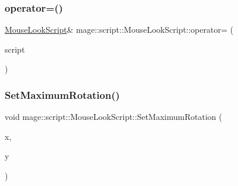 \subsubsection{\texorpdfstring{operator=()}{operator=()}\hspace{0.1cm}{\footnotesize\ttfamily [2/2]}}
{\footnotesize\ttfamily \hyperlink{classmage_1_1script_1_1_mouse_look_script}{Mouse\+Look\+Script}\& mage\+::script\+::\+Mouse\+Look\+Script\+::operator= (\begin{DoxyParamCaption}\item[{\hyperlink{classmage_1_1script_1_1_mouse_look_script}{Mouse\+Look\+Script} \&\&}]{script }\end{DoxyParamCaption})\hspace{0.3cm}{\ttfamily [delete]}}

\hypertarget{classmage_1_1script_1_1_mouse_look_script_a50c3ddaad18713509394d168cddc8aa8}{}\label{classmage_1_1script_1_1_mouse_look_script_a50c3ddaad18713509394d168cddc8aa8} 
\subsubsection{\texorpdfstring{Set\+Maximum\+Rotation()}{SetMaximumRotation()}\hspace{0.1cm}{\footnotesize\ttfamily [1/4]}}
{\footnotesize\ttfamily void mage\+::script\+::\+Mouse\+Look\+Script\+::\+Set\+Maximum\+Rotation (\begin{DoxyParamCaption}\item[{\hyperlink{namespacemage_aa97e833b45f06d60a0a9c4fc22ae02c0}{F32}}]{x,  }\item[{\hyperlink{namespacemage_aa97e833b45f06d60a0a9c4fc22ae02c0}{F32}}]{y }\end{DoxyParamCaption})\hspace{0.3cm}{\ttfamily [noexcept]}}

\hypertarget{classmage_1_1script_1_1_mouse_look_script_a50090ac02670c2f23972e73f9d0660d8}{}\label{classmage_1_1script_1_1_mouse_look_script_a50090ac02670c2f23972e73f9d0660d8} 
